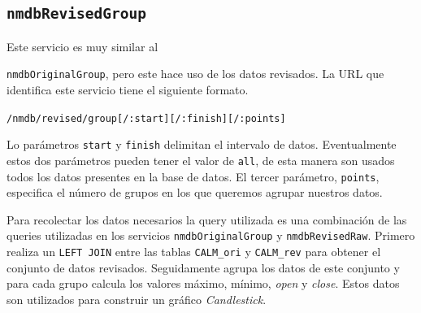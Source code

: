 	\subsection{\texttt{nmdbRevisedGroup}}
		Este servicio es muy similar al {\texttt{nmdbOriginalGroup}, pero este hace uso de los datos revisados. La URL que identifica este
		servicio tiene el siguiente formato.
			\begin{center} \texttt{/nmdb/revised/group[/:start][/:finish][/:points]}  \end{center}
		Lo parámetros \texttt{start} y \texttt{finish} delimitan el intervalo de datos. Eventualmente estos dos parámetros pueden tener el
		valor de \texttt{all}, de esta manera son usados todos los datos presentes en la base de datos. El tercer parámetro, \texttt{points},
		especifica el número de grupos en los que queremos agrupar nuestros datos.
		\par
		Para recolectar los datos necesarios la query utilizada es una combinación de las queries utilizadas en los servicios
		\texttt{nmdbOriginalGroup} y \texttt{nmdbRevisedRaw}. Primero realiza un \texttt{LEFT JOIN} entre las tablas \texttt{CALM\_ori} y
		\texttt{CALM\_rev} para obtener el conjunto de datos revisados. Seguidamente agrupa los datos de este conjunto y para cada grupo
		calcula los valores máximo, mínimo, \emph{open} y \emph{close}. Estos datos son utilizados para construir un gráfico
		\emph{Candlestick}.
}
